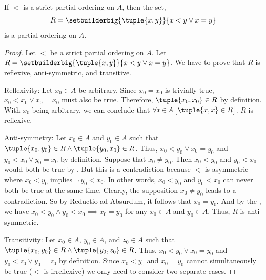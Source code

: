 \begin{lem}
    \label{lem:any-strict-partial-ordering-corresponds-to-a-partial-ordering}
    If \( < \) is a strict partial ordering on \( A \), then the set,
    \begin{equation*}
        R = \setbuilderbig{\tuple{x,y}}{x < y \lor x = y}
    \end{equation*}
    is a partial ordering on \( A \).
\end{lem}

\begin{proof}
    Let \( < \) be a strict partial ordering on \( A \). Let \( R = \setbuilderbig{\tuple{x,y}}{x < y \lor x = y} \).
    We have to prove that \( R \) is reflexive, anti-symmetric, and transitive.

    \vspace{0.3cm}
    \noindent
    Reflexivity: Let \( x_{0} \in A \) be arbitrary. Since \( x_{0} = x_{0} \) is trivially true, \( x_{0} < x_{0} \lor x_{0} = x_{0} \)
    must also be true. Therefore, \( \tuple{x_{0},x_{0}} \in R \) by definition. With \( x_{0} \) being arbitrary, we can conclude that
    \( \forall x\,{\in}\,A \, \big[ \tuple{x,x} \in R \big] \). \( R \) is reflexive.

    \vspace{0.3cm}
    \noindent
    Anti-symmetry: Let \( x_{0} \in A \) and \( y_{0} \in A \) such that \( \tuple{x_{0},y_{0}} \in R \land \tuple{y_{0},x_{0}} \in R \).
    Thus, \( x_{0} < y_{0} \lor x_{0} = y_{0} \) and \( y_{0} < x_{0} \lor y_{0} = x_{0} \) by definition. Suppose that \( x_{0} \neq y_{0} \).
    Then \( x_{0} < y_{0} \) and \( y_{0} < x_{0} \) would both be true by . But this is a contradiction because \( < \)
    is asymmetric where \( x_{0} < y_{0} \) implies \( \lnot \, y_{0} < x_{0} \). In other words, \( x_{0} < y_{0} \) and \( y_{0} < x_{0} \)
    can never both be true at the same time. Clearly, the supposition \( x_{0} \neq y_{0} \) leads to a contradiction. So by Reductio ad
    Absurdum, it follows that \( x_{0} = y_{0} \). And by the , we have \( x_{0} < y_{0} \land y_{0} < x_{0} {\implies} x_{0} = y_{0} \)
    for any \( x_{0} \in A \) and \( y_{0} \in A \). Thus, \( R \) is anti-symmetric.

    \vspace{0.3cm}
    \noindent
    Transitivity: Let \( x_{0} \in A \), \( y_{0} \in A \), and \( z_{0} \in A \) such that \( \tuple{x_{0},y_{0}} \in R \land \tuple{y_{0},z_{0}} \in R \).
    Thus, \( x_{0} < y_{0} \lor x_{0} = y_{0} \) and \( y_{0} < z_{0} \lor y_{0} = z_{0} \) by definition.
    Since \( x_{0} < y_{0} \) and \( x_{0} = y_{0} \) cannot simultaneously be true (\( < \) is irreflexive) we only need to consider two separate cases.


\end{proof}
